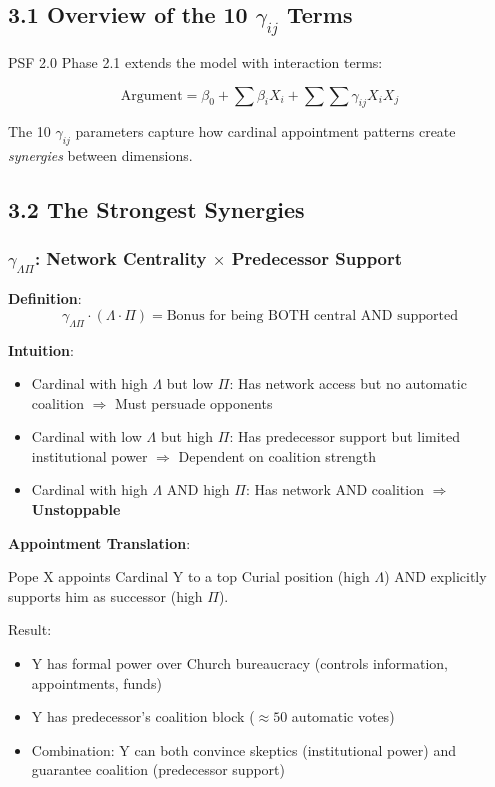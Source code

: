 \subsection{3.1 Overview of the 10 $\gamma_{ij}$ Terms}

PSF 2.0 Phase 2.1 extends the model with interaction terms:

\begin{equation}
\text{Argument} = \beta_0 + \sum \beta_i X_i + \sum \sum \gamma_{ij} X_i X_j
\end{equation}

The 10 $\gamma_{ij}$ parameters capture how cardinal appointment patterns create \textit{synergies} between dimensions.

\subsection{3.2 The Strongest Synergies}

\subsubsection{$\gamma_{\Lambda\Pi}$: Network Centrality $\times$ Predecessor Support}

\textbf{Definition}:
$$\gamma_{\Lambda\Pi} \cdot (\Lambda \cdot \Pi) = \text{Bonus for being BOTH central AND supported}$$

\textbf{Intuition}:

\begin{itemize}
\item Cardinal with high $\Lambda$ but low $\Pi$: Has network access but no automatic coalition $\Rightarrow$ Must persuade opponents
\item Cardinal with low $\Lambda$ but high $\Pi$: Has predecessor support but limited institutional power $\Rightarrow$ Dependent on coalition strength
\item Cardinal with high $\Lambda$ AND high $\Pi$: Has network AND coalition $\Rightarrow$ \textbf{Unstoppable}
\end{itemize}

\textbf{Appointment Translation}:

Pope X appoints Cardinal Y to a top Curial position (high $\Lambda$) AND explicitly supports him as successor (high $\Pi$).

Result:
\begin{itemize}
\item Y has formal power over Church bureaucracy (controls information, appointments, funds)
\item Y has predecessor's coalition block ($\approx 50$ automatic votes)
\item Combination: Y can both convince skeptics (institutional power) and guarantee coalition (predecessor support)
\end{itemize}

